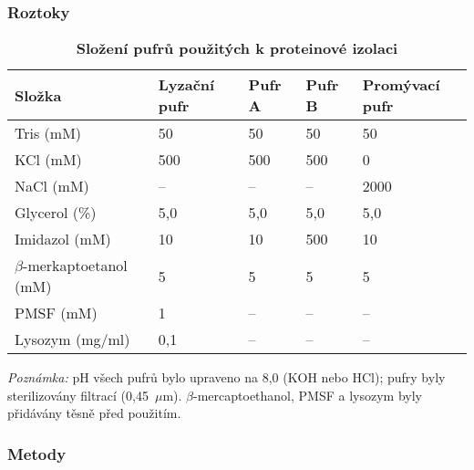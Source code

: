 \subsubsection{Roztoky}
\begin{table}[H]
\centering
\caption{\textbf{Složení pufrů použitých k proteinové izolaci}}
\label{tab:pufry}
\begin{adjustbox}{max width=\textwidth}
\begin{tabularx}{\textwidth}{|l|Y|Y|Y|Y|}
\hline
\textbf{Složka} & \textbf{Lyzační pufr} & \textbf{Pufr A} & \textbf{Pufr B} & \textbf{Promývací pufr} \\
\hline
Tris (mM) & 50 & 50 & 50 & 50 \\
KCl (mM) & 500 & 500 & 500 & 0 \\
NaCl (mM) & – & – & – & 2000 \\
Glycerol (\%) & 5{,}0 & 5{,}0 & 5{,}0 & 5{,}0 \\
Imidazol (mM) & 10 & 10 & 500 & 10 \\
$\beta$-merkaptoetanol (mM) & 5 & 5 & 5 & 5 \\
PMSF (mM) & 1 & – & – & – \\
Lysozym (mg/ml) & 0{,}1 & – & – & – \\
\hline
\end{tabularx}
\end{adjustbox}
\begin{flushleft}
\textit{Poznámka:} pH všech pufrů bylo upraveno na 8{,}0 (KOH nebo HCl); pufry byly sterilizovány filtrací (0{,}45~$\mu$m). $\beta$-mercaptoethanol, PMSF a lysozym byly přidávány těsně před použitím.
\end{flushleft}
\end{table}




\subsubsection{Metody}
